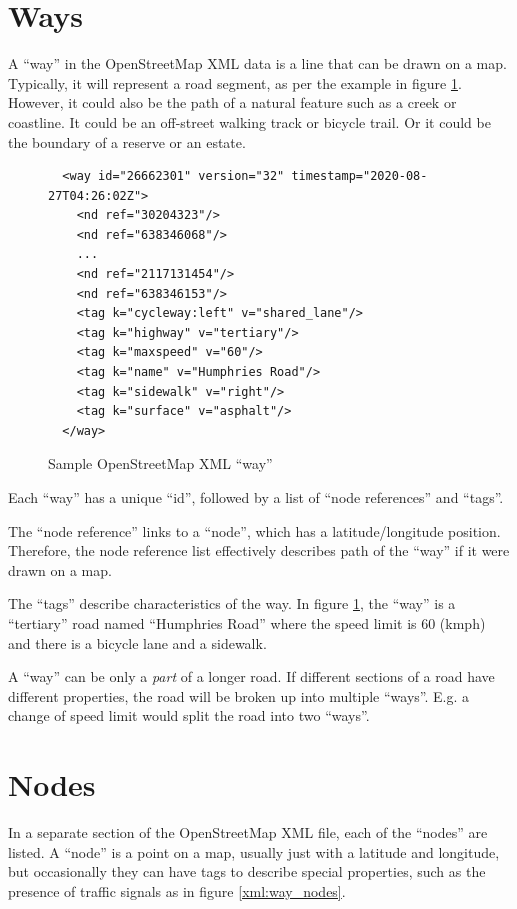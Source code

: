 \documentclass[11pt,twoside]{report}
\begin{document}
\section{Ways}
\label{osm:ways}

A ``way'' in the OpenStreetMap XML data is a line that can be drawn on a map.  Typically, it will represent a road segment, as per the example in figure \ref{xml:way_st}.  However, it could also be the path of a natural feature such as a creek or coastline.  It could be an off-street walking track or bicycle trail.  Or it could be the boundary of a reserve or an estate.

\begin{figure}[t]
\centering
\begin{verbatim}
  <way id="26662301" version="32" timestamp="2020-08-27T04:26:02Z">
    <nd ref="30204323"/>
    <nd ref="638346068"/>
    ...
    <nd ref="2117131454"/>
    <nd ref="638346153"/>
    <tag k="cycleway:left" v="shared_lane"/>
    <tag k="highway" v="tertiary"/>
    <tag k="maxspeed" v="60"/>
    <tag k="name" v="Humphries Road"/>
    <tag k="sidewalk" v="right"/>
    <tag k="surface" v="asphalt"/>
  </way>
\end{verbatim}
\caption{Sample OpenStreetMap XML ``way''}
\label{xml:way_st}
\end{figure}

Each ``way'' has a unique ``id'', followed by a list of ``node references'' and ``tags''.

The ``node reference'' links to a ``node'', which has a latitude/longitude position.  Therefore, the node reference list effectively describes path of the ``way'' if it were drawn on a map.

The ``tags'' describe characteristics of the way.  In figure \ref{xml:way_st}, the ``way'' is a ``tertiary'' road named ``Humphries Road'' where the speed limit is 60 (kmph) and there is a bicycle lane and a sidewalk.

A ``way'' can be only a \textit{part} of a longer road.  If different sections of a road have different properties, the road will be broken up into multiple ``ways''.  E.g. a change of speed limit would split the road into two ``ways''.

\clearpage
\section{Nodes}
\label{osm:nodes}

In a separate section of the OpenStreetMap XML file, each of the ``nodes'' are listed.  A ``node'' is a point on a map, usually just with a latitude and longitude, but occasionally they can have tags to describe special properties, such as the presence of traffic signals as in figure \ref{xml:way_nodes}.\\
\end{document}
